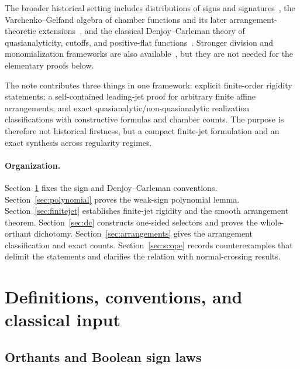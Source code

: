 \documentclass[11pt]{article}
\theoremstyle{definition}
\theoremstyle{remark}
\begin{document}
The broader historical setting includes distributions of signs and signatures~\cite{Fortuna1991,AcquistapaceBroglia1992,AcquistapaceBroglia1993Correction,AcquistapaceBrogliaFortuna1994,AcquistapaceBroglia1994}, the Varchenko--Gelfand algebra of chamber functions and its later arrangement-theoretic extensions~\cite{VarchenkoGelfand1987,Moseley2017,BjornerEtAl1999}, and the classical Denjoy--Carleman theory of quasianalyticity, cutoffs, and positive-flat functions~\cite{Rainer2022,Langenbruch2003,Thilliez2008}. Stronger division and monomialization frameworks are also available~\cite{BierstoneMilman2004,BelottoBierstoneChow2018,BelottoBierstone2023}, but they are not needed for the elementary proofs below.

The note contributes three things in one framework: explicit finite-order rigidity statements; a self-contained leading-jet proof for arbitrary finite affine arrangements; and exact quasianalytic/non-quasianalytic realization classifications with constructive formulas and chamber counts. The purpose is therefore not historical firstness, but a compact finite-jet formulation and an exact synthesis across regularity regimes.

\paragraph{Organization.}
Section~\ref{sec:setup} fixes the sign and Denjoy--Carleman conventions. Section~\ref{sec:polynomial} proves the weak-sign polynomial lemma. Section~\ref{sec:finitejet} establishes finite-jet rigidity and the smooth arrangement theorem. Section~\ref{sec:dc} constructs one-sided selectors and proves the whole-orthant dichotomy. Section~\ref{sec:arrangements} gives the arrangement classification and exact counts. Section~\ref{sec:scope} records counterexamples that delimit the statements and clarifies the relation with normal-crossing results.

\section{Definitions, conventions, and classical input}\label{sec:setup}

\subsection{Orthants and Boolean sign laws}
\end{document}
